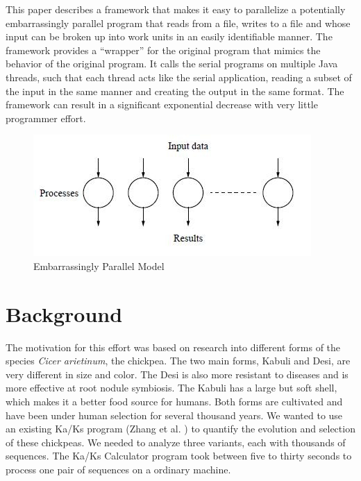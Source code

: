 \documentclass[12pt]{article}
\begin{document}
This paper describes a framework that makes it easy to parallelize a potentially
embarrassingly parallel program that reads from a file, writes to a file and
whose input can be broken up into work units in an easily identifiable manner.
The framework provides a ``wrapper'' for the original program that mimics the
behavior of the original program. It calls the serial programs on multiple Java
threads, such that each thread acts like the serial application, reading a
subset of the input in the same manner and creating the output in the same
format. The framework can result in a significant exponential decrease with very
little programmer effort. 

\begin{figure}
    \begin{center}
        \includegraphics{figures/ep.jpg}
    \end{center}
    \caption{Embarrassingly Parallel Model}
    \label{fig:ep}
\end{figure}

\section{Background}

The motivation for this effort was based on research into different forms of the
species \emph{Cicer arietinum}, the chickpea. The two main forms, Kabuli and
Desi, are very different in size and color. The Desi is also more resistant to
diseases and is more effective at root nodule symbiosis. The Kabuli has a large
but soft shell, which makes it a better food source for humans. Both forms are
cultivated and have been under human selection for several thousand years. We
wanted to use an existing Ka/Ks program (Zhang et al. \cite{kaks}) to quantify
the evolution and selection of these chickpeas. We needed to analyze three
variants, each with thousands of sequences. The Ka/Ks Calculator program took
between five to thirty seconds to process one pair of sequences on a ordinary
machine.
\end{document}
